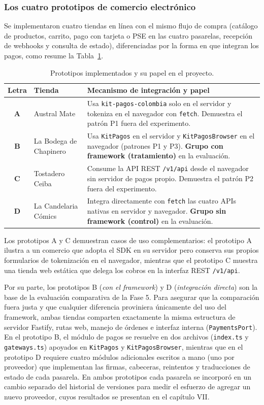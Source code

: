 \subsubsection{Los cuatro prototipos de comercio electrónico}

Se implementaron cuatro tiendas en línea con el mismo flujo de compra (catálogo de productos, carrito, pago con tarjeta o PSE en las cuatro pasarelas, recepción de webhooks y consulta de estado), diferenciadas por la forma en que integran los pagos, como resume la Tabla~\ref{tab:prototipos-resumen}.

\begin{table}[H]
\centering
\caption{Prototipos implementados y su papel en el proyecto.}
\label{tab:prototipos-resumen}
\small
\begin{tabular}{|c|p{4.0cm}|p{8.6cm}|}
\hline
\textbf{Letra} & \textbf{Tienda} & \textbf{Mecanismo de integración y papel} \\ \hline
\textbf{A} & Austral Mate & Usa \texttt{kit-pagos-colombia} solo en el servidor y tokeniza en el navegador con \texttt{fetch}. Demuestra el patrón P1 fuera del experimento. \\ \hline
\textbf{B} & La Bodega de Chapinero & Usa \texttt{KitPagos} en el servidor y \texttt{KitPagosBrowser} en el navegador (patrones P1 y P3). \textbf{Grupo con framework (tratamiento)} en la evaluación. \\ \hline
\textbf{C} & Tostadero Ceiba & Consume la API REST \texttt{/v1/api} desde el navegador sin servidor de pagos propio. Demuestra el patrón P2 fuera del experimento. \\ \hline
\textbf{D} & La Candelaria Cómics & Integra directamente con \texttt{fetch} las cuatro APIs nativas en servidor y navegador. \textbf{Grupo sin framework (control)} en la evaluación. \\ \hline
\end{tabular}
\end{table}

Los prototipos A y C demuestran casos de uso complementarios: el prototipo A ilustra a un comercio que adopta el SDK en su servidor pero conserva sus propios formularios de tokenización en el navegador, mientras que el prototipo C muestra una tienda web estática que delega los cobros en la interfaz REST \texttt{/v1/api}.

Por su parte, los prototipos B (\textit{con el framework}) y D (\textit{integración directa}) son la base de la evaluación comparativa de la Fase 5. Para asegurar que la comparación fuera justa y que cualquier diferencia proviniera únicamente del uso del framework, ambas tiendas comparten exactamente la misma estructura de servidor Fastify, rutas web, manejo de órdenes e interfaz interna (\texttt{PaymentsPort}). En el prototipo B, el módulo de pagos se resuelve en dos archivos (\texttt{index.ts} y \texttt{gateways.ts}) apoyados en \texttt{KitPagos} y \texttt{KitPagosBrowser}, mientras que en el prototipo D requiere cuatro módulos adicionales escritos a mano (uno por proveedor) que implementan las firmas, cabeceras, reintentos y traducciones de estado de cada pasarela. En ambos prototipos cada pasarela se incorporó en un cambio separado del historial de versiones para medir el esfuerzo de agregar un nuevo proveedor, cuyos resultados se presentan en el capítulo VII.

